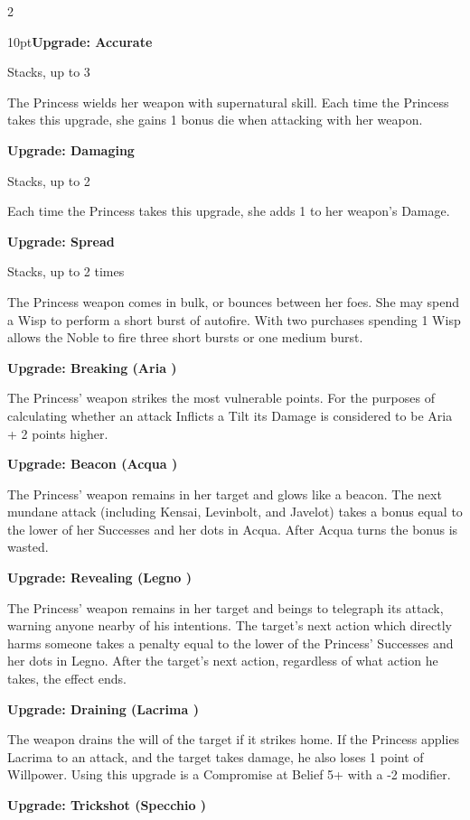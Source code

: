 \begin{multicols}{2}
\begin{myindentpar}{10pt}\textbf{Upgrade: Accurate}

Stacks, up to 3

The Princess wields her weapon with supernatural skill. Each time the Princess takes this upgrade, she gains 1 bonus die when attacking with her weapon.

\textbf{Upgrade: Damaging}

Stacks, up to 2

Each time the Princess takes this upgrade, she adds 1 to her weapon’s Damage. 

\textbf{Upgrade: Spread}

Stacks, up to 2 times

The Princess weapon comes in bulk, or bounces between her foes. She may spend a Wisp to perform a short burst of autofire. With two purchases spending 1 Wisp allows the Noble to fire three short bursts or one medium burst. 

\textbf{Upgrade: Breaking (Aria \textbullet\textbullet)}

The Princess' weapon strikes the most vulnerable points. For the purposes of calculating whether an attack Inflicts a Tilt its Damage is considered to be Aria + 2 points higher. 

\textbf{Upgrade: Beacon (Acqua \textbullet\textbullet)}

The Princess' weapon remains in her target and glows like a beacon. The next mundane attack (including Kensai, Levinbolt, and Javelot) takes a bonus equal to the lower of her Successes and her dots in Acqua. After Acqua turns the bonus is wasted. 

\textbf{Upgrade: Revealing (Legno \textbullet\textbullet)}

The Princess' weapon remains in her target and beings to telegraph its attack, warning anyone nearby of his intentions. The target's next action which directly harms someone takes a penalty equal to the lower of the Princess' Successes and her dots in Legno. After the target's next action, regardless of what action he takes, the effect ends. 

\textbf{Upgrade: Draining (Lacrima \textbullet\textbullet)}

The weapon drains the will of the target if it strikes home. If the Princess applies Lacrima to an attack, and the target takes damage, he also loses 1 point of Willpower. Using this upgrade is a Compromise at Belief 5+ with a -2 modifier.

\textbf{Upgrade: Trickshot (Specchio \textbullet\textbullet)}


\end{myindentpar}
\end{multicols}
